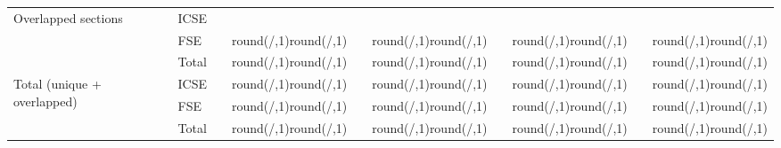 \documentclass{article}
\newcommand{\ShowPercentageNoHundred}[2]{%
    \edef\percentage{\fpeval{round(#1/#2*100,1)}}%
    \ifdim\percentage pt < 10pt
        (\hspace*{4.3pt}\num{\percentage}\%)
    \else
        (\num{\percentage}\%)
    \fi
}
\newcommand*\ChartWithAbsoluteAndPercentageNumbersD[2]{
  \numprint{#1}&\ShowPercentageNoHundred{#1}{#2}
}
\begin{document}
\begin{table}[htbp]
\begin{tabular}{@{}l l r @{\hskip 0.04in} l r @{\hskip 0.04in} l r @{\hskip 0.04in} l r @{\hskip 0.04in} l@{}}
\multirow{3}{*}{Overlapped sections}&
ICSE&
  \ChartWithAbsoluteAndPercentageNumbersD{\varLinkInIntroductionAndMoreICSE}{\varTotalOfPapersWithLinkICSE}&
  \ChartWithAbsoluteAndPercentageNumbersD{\varLinkInConclusionAndMoreICSE}{\varTotalOfPapersWithLinkICSE}&
  \ChartWithAbsoluteAndPercentageNumbersD{\varLinkInSpecificAndMoreICSE}{\varTotalOfPapersWithLinkICSE}&
  \ChartWithAbsoluteAndPercentageNumbersD{\varLinkInOtherPlaceAndMoreICSE}{\varTotalOfPapersWithLinkICSE}\\
&
FSE&
  \ChartWithAbsoluteAndPercentageNumbersD{\varLinkInIntroductionAndMoreFSE}{\varTotalOfPapersWithLinkFSE}&
  \ChartWithAbsoluteAndPercentageNumbersD{\varLinkInConclusionAndMoreFSE}{\varTotalOfPapersWithLinkFSE}&
  \ChartWithAbsoluteAndPercentageNumbersD{\varLinkInSpecificAndMoreFSE}{\varTotalOfPapersWithLinkFSE}&
  \ChartWithAbsoluteAndPercentageNumbersD{\varLinkInOtherPlaceAndMoreFSE}{\varTotalOfPapersWithLinkFSE}\\
  &
Total&
  \ChartWithAbsoluteAndPercentageNumbersD{\varLinkInIntroductionAndMoreICSEFSE}{\varTotalOfPapersWithLinkICSEFSE}&
  \ChartWithAbsoluteAndPercentageNumbersD{\varLinkInConclusionAndMoreICSEFSE}{\varTotalOfPapersWithLinkICSEFSE}&
  \ChartWithAbsoluteAndPercentageNumbersD{\varLinkInSpecificAndMoreICSEFSE}{\varTotalOfPapersWithLinkICSEFSE}&
  \ChartWithAbsoluteAndPercentageNumbersD{\varLinkInOtherPlaceAndMoreICSEFSE}{\varTotalOfPapersWithLinkICSEFSE}\\ 
     \midrule
\multirow{3}{*}{Total (unique + overlapped)}
&
ICSE&
  \ChartWithAbsoluteAndPercentageNumbersD{\varLinkInIntroductionICSE}{\varTotalOfPapersWithLinkICSE}&
  \ChartWithAbsoluteAndPercentageNumbersD{\varLinkInConclusionICSE}{\varTotalOfPapersWithLinkICSE}&
  \ChartWithAbsoluteAndPercentageNumbersD{\varLinkInSpecificICSE}{\varTotalOfPapersWithLinkICSE}&
  \ChartWithAbsoluteAndPercentageNumbersD{\varLinkInOtherPlaceICSE}{\varTotalOfPapersWithLinkICSE}\\
&
FSE&
  \ChartWithAbsoluteAndPercentageNumbersD{\varLinkInIntroductionFSE}{\varTotalOfPapersWithLinkFSE}&
  \ChartWithAbsoluteAndPercentageNumbersD{\varLinkInConclusionFSE}{\varTotalOfPapersWithLinkFSE}&
  \ChartWithAbsoluteAndPercentageNumbersD{\varLinkInSpecificFSE}{\varTotalOfPapersWithLinkFSE}&
  \ChartWithAbsoluteAndPercentageNumbersD{\varLinkInOtherPlaceFSE}{\varTotalOfPapersWithLinkFSE}\\
  &
Total&
  \ChartWithAbsoluteAndPercentageNumbersD{\varLinkInIntroductionICSEFSE}{\varTotalOfPapersWithLinkICSEFSE}&
  \ChartWithAbsoluteAndPercentageNumbersD{\varLinkInConclusionICSEFSE}{\varTotalOfPapersWithLinkICSEFSE}&
  \ChartWithAbsoluteAndPercentageNumbersD{\varLinkInSpecificICSEFSE}{\varTotalOfPapersWithLinkICSEFSE}&
  \ChartWithAbsoluteAndPercentageNumbersD{\varLinkInOtherPlaceICSEFSE}{\varTotalOfPapersWithLinkICSEFSE}\\ 
  \bottomrule
\end{tabular}
\end{table}
\end{document}
